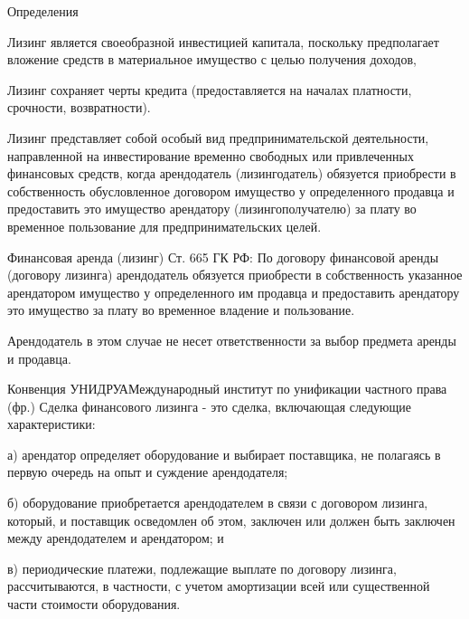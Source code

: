 \documentclass[_Banking_p3.tex]{subfiles}
\begin{document}
\begin{frame} [ allowframebreaks]{Определения}

\begin{block}{Лизинг}
\quad
 является своеобразной инвестицией капитала, поскольку предполагает вложение средств в материальное имущество с целью получения доходов, 
\end{block}

\begin{block}{Лизинг}
\quad
сохраняет черты кредита (предоставляется на началах платности, срочности, возвратности).
\end{block}

\pagebreak
\begin{block}{Лизинг} 
\quad
представляет собой особый вид предпринимательской деятельности, направленной на инвестирование временно свободных или привлеченных финансовых средств, когда арендодатель (лизингодатель) обязуется приобрести в собственность обусловленное договором имущество у определенного продавца и предоставить это имущество арендатору (лизингополучателю) за плату во временное пользование для предпринимательских целей.
\end{block}
\end{frame}

\begin{frame}
\begin{block}{Финансовая аренда (лизинг)}
\quad
Ст. 665 ГК РФ: По договору финансовой аренды (договору лизинга) арендодатель обязуется приобрести в собственность указанное арендатором имущество у определенного им продавца и предоставить арендатору это имущество за плату во временное владение и пользование. 

Арендодатель в этом случае не несет ответственности за выбор предмета аренды и продавца.
\end{block}
\end{frame}

\begin{frame}[ allowframebreaks ]{Конвенция УНИДРУА}{Международный институт по унификации частного права (фр.)}
Сделка финансового лизинга - это сделка, включающая следующие характеристики:

а) арендатор определяет оборудование и выбирает поставщика, не полагаясь в первую очередь на опыт и суждение арендодателя;

\pagebreak
б) оборудование приобретается арендодателем в связи с договором лизинга, который, и поставщик осведомлен об этом, заключен или должен быть заключен между арендодателем и арендатором; и

в) периодические платежи, подлежащие выплате по договору лизинга, рассчитываются, в частности, с учетом амортизации всей или существенной части стоимости оборудования.
\end{frame}
\end{document}
